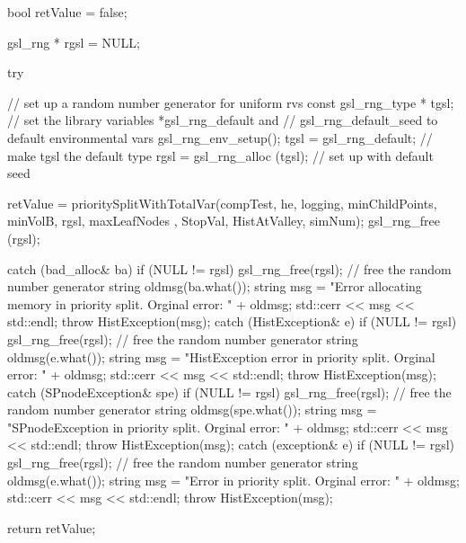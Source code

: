 \begin{DoxyCode}
{
    bool retValue = false;

    gsl_rng * rgsl = NULL;

    try {
        // set up a random number generator for uniform rvs
        const gsl_rng_type * tgsl;
        // set the library variables *gsl_rng_default and
        // gsl_rng_default_seed to default environmental vars
        gsl_rng_env_setup();
        tgsl = gsl_rng_default; // make tgsl the default type
        rgsl = gsl_rng_alloc (tgsl); // set up with default seed

        retValue = prioritySplitWithTotalVar(compTest, he, logging,
                                    minChildPoints, minVolB, rgsl, maxLeafNodes
      , 
                                    StopVal, HistAtValley, simNum);
        gsl_rng_free (rgsl);
    }

    catch (bad_alloc& ba) {
        if (NULL != rgsl) gsl_rng_free(rgsl); // free the random number
       generator
        string oldmsg(ba.what());
        string msg = "Error allocating memory in priority split.  Orginal
       error: "
                                     + oldmsg;
        std::cerr << msg << std::endl;
        throw HistException(msg);
    }
    catch (HistException& e) {
        if (NULL != rgsl) gsl_rng_free(rgsl); // free the random number
       generator
        string oldmsg(e.what());
        string msg = "HistException error in priority split.  Orginal error: "
                                    + oldmsg;
        std::cerr << msg << std::endl;
        throw HistException(msg);
    }
    catch (SPnodeException& spe) {
        if (NULL != rgsl) gsl_rng_free(rgsl); // free the random number
       generator
        string oldmsg(spe.what());
        string msg = "SPnodeException in priority split.  Orginal error: "
                                    + oldmsg;
        std::cerr << msg << std::endl;
        throw HistException(msg);
    }
    catch (exception& e) {
        if (NULL != rgsl) gsl_rng_free(rgsl); // free the random number
       generator
        string oldmsg(e.what());
        string msg = "Error in priority split.  Orginal error: " + oldmsg;
        std::cerr << msg << std::endl;
        throw HistException(msg);
    }

    return retValue;
}
\end{DoxyCode}
